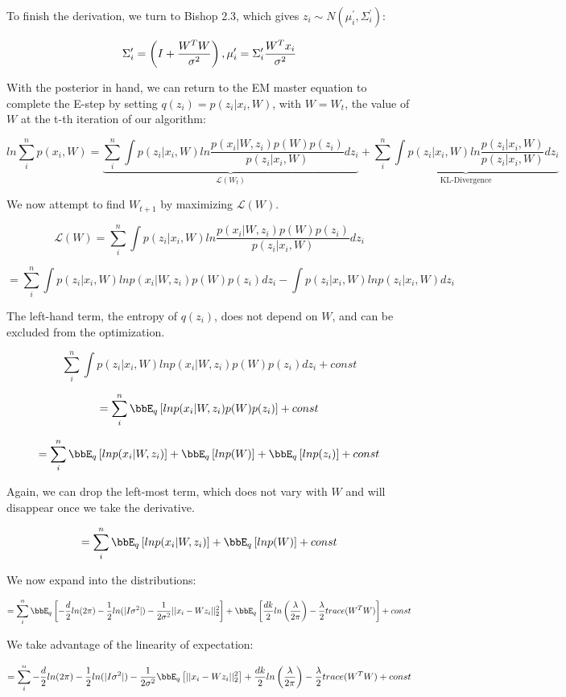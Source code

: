 \documentclass[twoside,11pt]{homework}
\begin{document}
To finish the derivation, we turn to Bishop 2.3, which gives $z_i \sim N(\mu_i^\prime, \Sigma_i^\prime)$:

\[
\Sigma_i^\prime = \left(I + \frac{W^TW}{\sigma^2}\right), \mu_i^\prime = \Sigma_i^\prime\frac{W^Tx_i}{\sigma^2}
\]

With the posterior in hand, we can return to the EM master equation to complete the E-step by setting $q(z_i) = p(z_i|x_i, W)$, with $W = W_t$, the value of $W$ at the t-th iteration of our algorithm:

\[
ln \sum_i^n p(x_i,W) =
\underbrace{
\sum_i^n \int p(z_i|x_i, W) ln \frac{p(x_i|W, z_i)p(W)p(z_i)}{p(z_i|x_i, W)} dz_i}_{\mathcal{L}(W_t)} +
\underbrace{
\sum_i^n \int p(z_i|x_i, W)ln \frac{p(z_i|x_i, W)}{p(z_i|x_i,W)} dz_i}_{\text{KL-Divergence}}
\]

We now attempt to find $W_{t+1}$ by maximizing $\mathcal{L}(W)$.

\[
\mathcal{L}(W) = \sum_i^n \int p(z_i|x_i, W) ln \frac{p(x_i|W, z_i)p(W)p(z_i)}{p(z_i|x_i, W)} dz_i
\]

\[
= \sum_i^n \int p(z_i|x_i, W) ln p(x_i|W, z_i)p(W)p(z_i) dz_i - 
\int p(z_i|x_i, W) ln p(z_i|x_i, W) dz_i
\]

The left-hand term, the entropy of $q(z_i)$, does not depend on $W$, and can be excluded from the optimization.

\[
\sum_i^n \int p(z_i|x_i, W) ln p(x_i|W, z_i)p(W)p(z_i) dz_i
+ const
\]

\[
= \sum_i^n \bbE_q \Brackets{ln p(x_i|W, z_i)p(W)p(z_i)}
+ const
\]

\[
= \sum_i^n \bbE_q \Brackets{ln p(x_i|W, z_i)} +
\bbE_q \Brackets{lnp(W)} +
\bbE_q \Brackets{lnp(z_i)}
+ const
\]

Again, we can drop the left-most term, which does not vary with $W$ and will disappear once we take the derivative.

\[
= \sum_i^n \bbE_q \Brackets{ln p(x_i|W, z_i)} +
\bbE_q \Brackets{lnp(W)}
+ const
\]

We now expand into the distributions:

\[
= \sum_i^n
\bbE_q \Brackets{-\frac{d}{2}ln(2\pi) - \frac{1}{2}ln(|I\sigma^2|) - \frac{1}{2\sigma^2}||x_i - Wz_i||_2^2} +
\bbE_q \Brackets{\frac{dk}{2}ln\Parens{\frac{\lambda}{2\pi}} - \frac{\lambda}{2}trace(W^TW)}
+ const
\]

We take advantage of the linearity of expectation:

\[
= \sum_i^n
-\frac{d}{2}ln(2\pi) - \frac{1}{2}ln(|I\sigma^2|) - \frac{1}{2\sigma^2}
\bbE_q \Brackets{
||x_i - Wz_i||_2^2
} +
\frac{dk}{2}ln\Parens{\frac{\lambda}{2\pi}} - \frac{\lambda}{2}trace(W^TW)
+ const
\]
\end{document}
